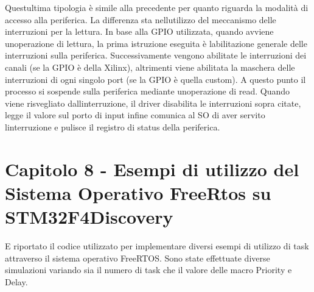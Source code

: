Quest\textquotesingle{}ultima tipologia è simile alla precedente per quanto riguarda la modalità di accesso alla periferica. La differenza sta nell\textquotesingle{}utilizzo del meccanismo delle interruzioni per la lettura. In base alla G\+P\+IO utilizzata, quando avviene un\textquotesingle{}operazione di lettura, la prima istruzione eseguita è l\textquotesingle{}abilitazione generale delle interruzioni sulla periferica. Successivamente vengono abilitate le interruzioni dei canali (se la G\+P\+IO è della Xilinx), altrimenti viene abilitata la maschera delle interruzioni di ogni singolo port (se la G\+P\+IO è quella custom). A questo punto il processo si sospende sulla periferica mediante un\textquotesingle{}operazione di read. Quando viene risvegliato dall\textquotesingle{}interruzione, il driver disabilita le interruzioni sopra citate, legge il valore sul porto di input infine comunica al SO di aver servito l\textquotesingle{}interruzione e pulisce il registro di status della periferica.\hypertarget{index_eight}{}\section{Capitolo 8 -\/ Esempi di utilizzo del Sistema Operativo Free\+Rtos su S\+T\+M32\+F4\+Discovery}\label{index_eight}
E\textquotesingle{} riportato il codice utilizzato per implementare diversi esempi di utilizzo di task attraverso il sistema operativo Free\+R\+T\+OS. Sono state effettuate diverse simulazioni variando sia il numero di task che il valore delle macro Priority e Delay. 